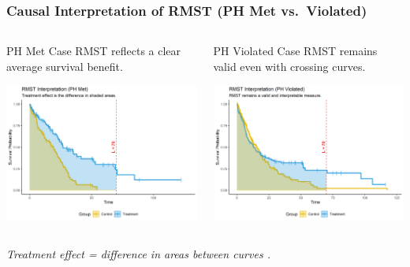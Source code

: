 \documentclass{beamer}
\begin{document}
\begin{frame}
\frametitle{Causal Interpretation of RMST (PH Met vs.\ Violated)}
\begin{columns}
\begin{column}{0.5\textwidth}
\begin{block}{PH Met Case}
RMST reflects a clear average survival benefit.
\end{block}
\includegraphics[width=\textwidth, height = 0.8\textwidth]{images/rmst_causal_plot_ph_met.png}
\end{column}
\begin{column}{0.5\textwidth}
\begin{block}{PH Violated Case}
RMST remains valid even with crossing curves.
\end{block}
\includegraphics[width=\textwidth, height = 0.8\textwidth]{images/rmst_causal_plot_ph_violated.png}
\end{column}
\end{columns}

\small\textit{Treatment effect = difference in areas between curves \cite{royston2013}.}
\end{frame}
\end{document}
